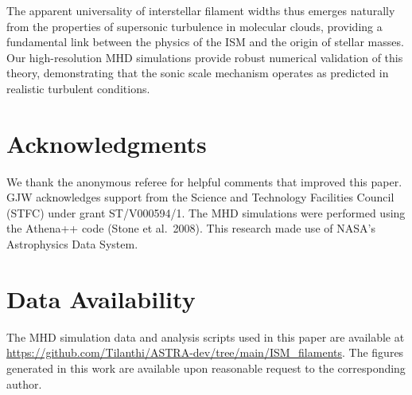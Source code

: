 \documentclass{mnras}
\begin{document}
The apparent universality of interstellar filament widths thus emerges naturally from the properties of supersonic turbulence in molecular clouds, providing a fundamental link between the physics of the ISM and the origin of stellar masses. Our high-resolution MHD simulations provide robust numerical validation of this theory, demonstrating that the sonic scale mechanism operates as predicted in realistic turbulent conditions.


\section*{Acknowledgments}

We thank the anonymous referee for helpful comments that improved this paper. GJW acknowledges support from the Science and Technology Facilities Council (STFC) under grant ST/V000594/1. The MHD simulations were performed using the Athena++ code (Stone et al.~2008). This research made use of NASA's Astrophysics Data System.


\section*{Data Availability}

The MHD simulation data and analysis scripts used in this paper are available at \url{https://github.com/Tilanthi/ASTRA-dev/tree/main/ISM_filaments}. The figures generated in this work are available upon reasonable request to the corresponding author.




\end{document}
